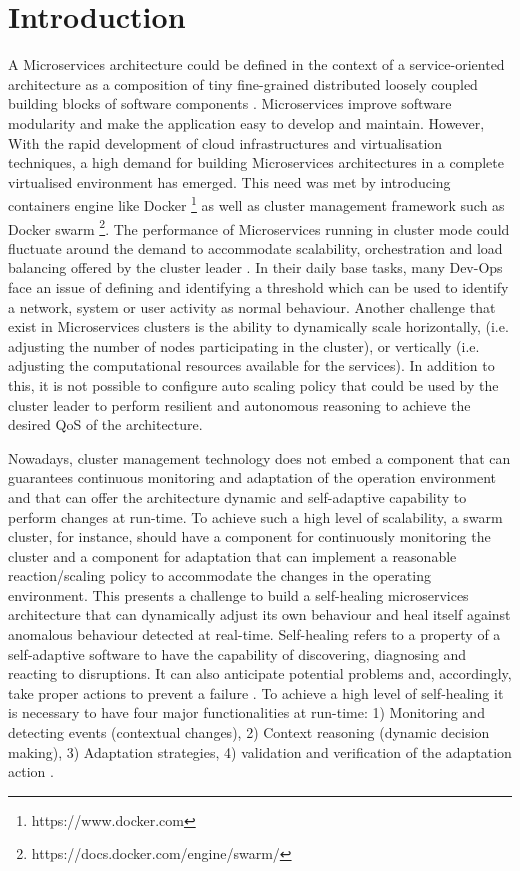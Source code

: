 \documentclass[graybox]{svmult}
\begin{document}
\section{Introduction}
\label{sec:1}
A Microservices architecture could be defined in the context of a service-oriented architecture as a composition of tiny fine-grained distributed loosely coupled building blocks of software components \cite{stubbs2015distributed}. Microservices improve software modularity and make the application easy to develop and maintain. However, With the rapid development of cloud infrastructures and virtualisation techniques, a high demand for building Microservices architectures in a complete virtualised environment has emerged. This need was met by introducing containers engine like Docker \footnote{https://www.docker.com} as well as cluster management framework such as Docker swarm \footnote{https://docs.docker.com/engine/swarm/}.  
The performance of Microservices running in cluster mode could fluctuate around the demand to accommodate scalability, orchestration and load balancing offered by the cluster leader \cite{stubbs2015distributed}. In their daily base tasks,  many Dev-Ops face an issue of defining and identifying a threshold which can be used to identify a network, system or user activity as normal behaviour. Another challenge that exist in Microservices clusters is the ability to dynamically scale horizontally, (i.e. adjusting the number of nodes participating in the cluster), or vertically (i.e. adjusting the computational resources available for the services). In addition to this, it is not possible to configure auto scaling policy that could be used by the cluster leader to perform resilient and autonomous reasoning to achieve the desired QoS of the architecture. 

Nowadays, cluster management technology does not embed a component that can guarantees continuous monitoring and adaptation of the operation environment and that can offer the architecture dynamic and self-adaptive capability to perform  changes at run-time. To achieve such a high level of scalability, a swarm cluster, for instance, should have a component for continuously monitoring the cluster and a component for adaptation that can implement a reasonable reaction/scaling policy to accommodate the changes in the operating environment. This presents a challenge to build a self-healing microservices architecture that can dynamically adjust its own behaviour and heal itself against anomalous behaviour detected at real-time. Self-healing refers to a property of a self-adaptive software to have the capability of discovering, diagnosing and reacting to disruptions. It can also anticipate potential problems and, accordingly, take proper actions to prevent a failure \cite{Salehie:2009p3693}. To achieve a high level of  self-healing it is necessary to have four major functionalities at run-time: 1) Monitoring and detecting events (contextual changes), 2) Context reasoning (dynamic decision making), 3) Adaptation strategies, 4) validation and verification of the adaptation action \cite{Kapitsaki:2009p3694}.  
\end{document}
